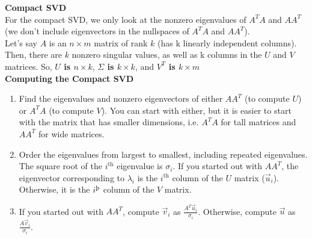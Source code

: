 \textbf{Compact SVD} \\
\newline
For the compact SVD, we only look at the nonzero eigenvalues of $A^T A$ and $AA^T$ (we don't include eigenvectors in the nullspaces of $A^T A$ and $A A^T$). \\
\newline
Let's say $A$ is an $n \times m$ matrix of rank $k$ (has k linearly independent columns). Then, there are $k$ nonzero singular values, as well as k columns in the $U$ and $V$ matrices. So, \textbf{$U$ is $n \times k$}, \textbf{$\Sigma$ is $k \times k$}, and \textbf{$V^T$ is $k \times m$} \\
\newline
\textbf{Computing the Compact SVD}
\begin{enumerate}
    \item Find the eigenvalues and nonzero eigenvectors of either $A A^T$ (to compute $U$) or $A^T A$ (to compute $V$). You can start with either, but it is easier to start with the matrix that has smaller dimensions, i.e. $A^T A$ for tall matrices and $AA^T$ for wide matrices. 
    \item Order the eigenvalues from largest to smallest, including repeated eigenvalues. The square root of the $i^{\text{th}}$ eigenvalue is $\sigma_i$. If you started out with $AA^T$, the eigenvector corresponding to $\lambda_i$ is the $i^{\text{th}}$ column of the $U$ matrix ($\vec{u}_i$). Otherwise, it is the $i^{\text{\th}}$ column of the $V$ matrix.
    \item If you started out with $AA^T$, compute $\vec{v}_i$ as $\frac{A^T \vec{u}_i}{\sigma_i}$. Otherwise, compute $\vec{u}$ as $\frac{A \vec{v}_i}{\sigma_i}$.
\end{enumerate}

